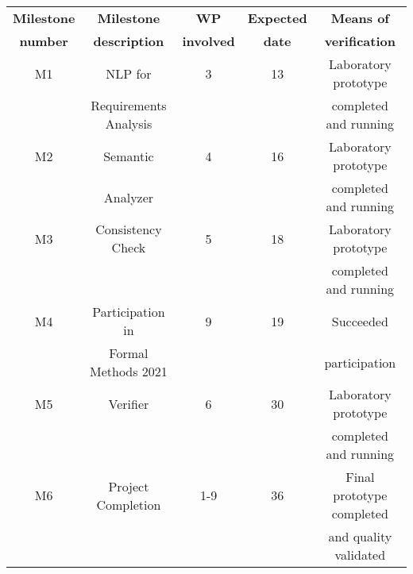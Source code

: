 \begin{center}
	\begin{adjustbox}{width=1\textwidth}
		\begin{tabular}{ |c|c|c|c|c|} 
			\hline
			\textbf{Milestone} & \textbf{Milestone} & \textbf{WP} & \textbf{Expected} & \textbf{Means of}\\
			\textbf{number} & \textbf{description} & \textbf{involved} & \textbf{date} & \textbf{verification} \\
			\hline
			
			M1 & NLP for & 3 & 13 & Laboratory prototype\\
			~ & Requirements Analysis & ~ & ~ & completed and running\\
			\hline
			
			M2 & Semantic & 4 & 16 & Laboratory prototype\\
			~ & Analyzer & ~ & ~ & completed and running\\
			\hline
			
			M3 & Consistency Check & 5 & 18 & Laboratory prototype\\
			~ & ~ & ~ & ~ & completed and running \\
			\hline
			
			M4 & Participation in & 9 & 19 & Succeeded\\
			~ & Formal Methods 2021 & ~ & ~ & participation \\
			\hline
			
			M5 & Verifier & 6 & 30 & Laboratory prototype\\
			~ & ~ & ~ & ~ & completed and running \\
			\hline
			
			M6 & Project Completion & 1-9 & 36 & Final prototype completed\\
			~ & ~ & ~ & ~ & and quality validated \\
			\hline
			
		\end{tabular}
	\end{adjustbox}
\end{center}